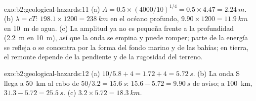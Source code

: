 \begin{solution}{exo:b2:geological-hazards:11}
(a) $A = 0.5 \times (4000/10)^{1/4} = 0.5 \times 4.47 = \qty{2.24}{m}$. (b) $\lambda = cT$:
$198.1 \times 1200 = \qty{238}{km}$ en el océano profundo, $9.90 \times 1200 = \qty{11.9}{km}$ en
\qty{10}{m} de agua. (c) La amplitud ya no es pequeña frente a la profundidad (\qty{2.2}{m} en
\qty{10}{m}), así que la onda se empina y puede romper; parte de la energía se refleja o se concentra por la
forma del fondo marino y de las bahías; en tierra, el remonte depende de la pendiente y de la rugosidad del
terreno.
\end{solution}

\begin{solution}{exo:b2:geological-hazards:12}
(a) $10/5.8 + 4 = 1.72 + 4 = \qty{5.72}{s}$. (b) La onda S llega a \qty{50}{km} al cabo de $50/3.2 =
\qty{15.6}{s}$: $15.6 - 5.72 = \qty{9.90}{s}$ de aviso; a \qty{100}{km}, $31.3 - 5.72 =
\qty{25.5}{s}$. (c) $3.2 \times 5.72 = \qty{18.3}{km}$.
\end{solution}

